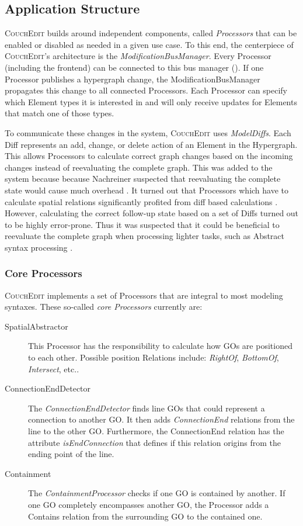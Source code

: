 \subsection{Application Structure}
\textsc{CouchEdit} builds around independent components, called \emph{Processors} that can be enabled or disabled as needed in a given use case. To this end, the centerpiece of \textsc{CouchEdit}'s architecture is the \emph{ModificationBusManager}. Every Processor (including the frontend) can be connected to this bus manager (). If one Processor publishes a hypergraph change, the ModificationBusManager propagates this change to all connected Processors. Each Processor can specify which Element types it is interested in and will only receive updates for Elements that match one of those types. 

To communicate these changes in the system, \textsc{CouchEdit} uses \emph{ModelDiffs}. Each Diff represents an add, change, or delete action of an Element in the Hypergraph. This allows Processors to calculate correct graph changes based on the incoming changes instead of reevaluating the complete graph. This was added to the system because because Nachreiner suspected that reevaluating the complete state would cause much overhead \cite{nachreiner_couchedit_2020}. It turned out that Processors which have to calculate spatial relations significantly profited from diff based calculations  \cite{nachreiner_couchedit_2020}. However, calculating the correct follow-up state based on a set of Diffs turned out to be highly error-prone. Thus it was suspected that it could be beneficial to reevaluate the complete graph when processing lighter tasks, such as Abstract syntax processing \cite{nachreiner_couchedit_2020}.

\subsubsection{Core Processors}
\label{sec:core-processors}
\textsc{CouchEdit} implements a set of Processors that are integral to most modeling syntaxes. These so-called \emph{core Processors} currently are: 
\begin{description}
  \item[SpatialAbstractor] This Processor has the responsibility to calculate how GOs are positioned to each other. Possible position Relations include: \emph{RightOf}, \emph{BottomOf}, \emph{Intersect}, etc..
  \item[ConnectionEndDetector] The \emph{ConnectionEndDetector} finds line GOs that could represent a connection to another GO. It then adds \emph{ConnectionEnd} relations from the line to the other GO. Furthermore, the ConnectionEnd relation has the attribute \emph{isEndConnection} that defines if this relation origins from the ending point of the line.
  \item[Containment] The \emph{ContainmentProcessor} checks if one GO is contained by another. If one GO completely encompasses another GO, the Processor adds a Contains relation from the surrounding GO to the contained one.
\end{description}


